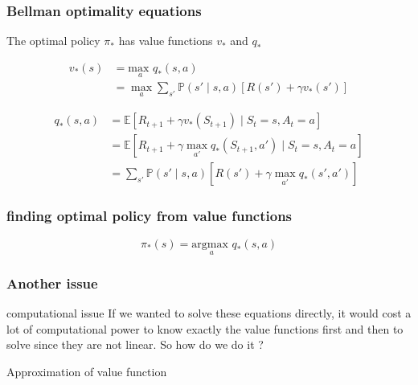 \documentclass[dvipsnames,svgnames]{beamer}
\begin{document}
\begin{frame}
\frametitle{Bellman optimality equations}

The optimal policy $\pi_{*}$ has value functions  $v_*$ and $q_*$

\begin{block}{}

\begin{equation*}
\begin{split}
v_{*}(s)&=\underset{a}{\text{max }} q_{*}(s,a)
\\&=\max_{a} \sum_{s'}\mathbb{P}(s'\mid s,a)[R(s')+\gamma v_{*}(s')]
\end{split}
\end{equation*}
\end{block}

\begin{block}{}
\begin{equation*}
\begin{split}
q_{*}(s,a)&=\mathbb{E}\left[ R_{t+1} + \gamma v_{*}(S_ {t+1}) \mid S_t = s, A_t = a \right]
\\&=\mathbb{E}\left[ R_{t+1} + \gamma \max_{a'} q_{*}(S_{t+1},a') \mid S_t = s, A_t = a \right]
\\&= \sum_{s'}\mathbb{P}(s' \mid s,a)[R(s')+\gamma \max_{a'}q_{*}(s',a')]
\end{split}
\end{equation*}
\end{block}

\end{frame}


\begin{frame}
\frametitle{finding optimal policy from value functions}
\begin{block}{}

$$\pi_{*}(s)= \underset{a}{\text{argmax }}q_*(s,a)$$
\end{block}
\end{frame}

\begin{frame}
\frametitle{Another issue}
\begin{alertblock}{computational issue}
If we wanted to solve these equations directly, it would cost a lot of computational power to know exactly the value functions first and then to solve since they are not linear. So how do we do it ? 
\end{alertblock}

\pause 
\vspace{1cm}
\centering
Approximation of value function

\end{frame}
\end{document}
